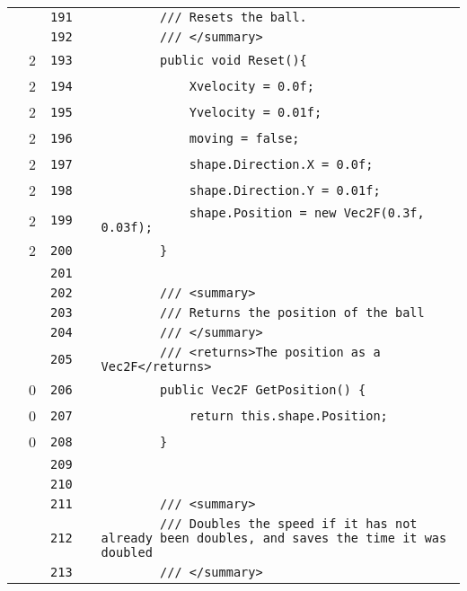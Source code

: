 \documentclass[a4paper,landscape,10pt]{article}
\begin{document}
\begin{longtable}[l]{lrrll}
\cellcolor{gray} &  & \verb~191~ & & \verb~        /// Resets the ball.~\\
\cellcolor{gray} &  & \verb~192~ & & \verb~        /// </summary>~\\
\cellcolor{green} & 2 & \verb~193~ & & \verb~        public void Reset(){~\\
\cellcolor{green} & 2 & \verb~194~ & & \verb~            Xvelocity = 0.0f;~\\
\cellcolor{green} & 2 & \verb~195~ & & \verb~            Yvelocity = 0.01f;~\\
\cellcolor{green} & 2 & \verb~196~ & & \verb~            moving = false;~\\
\cellcolor{green} & 2 & \verb~197~ & & \verb~            shape.Direction.X = 0.0f;~\\
\cellcolor{green} & 2 & \verb~198~ & & \verb~            shape.Direction.Y = 0.01f;~\\
\cellcolor{green} & 2 & \verb~199~ & & \verb~            shape.Position = new Vec2F(0.3f, 0.03f);~\\
\cellcolor{green} & 2 & \verb~200~ & & \verb~        }~\\
\cellcolor{gray} &  & \verb~201~ & & \verb~~\\
\cellcolor{gray} &  & \verb~202~ & & \verb~        /// <summary>~\\
\cellcolor{gray} &  & \verb~203~ & & \verb~        /// Returns the position of the ball~\\
\cellcolor{gray} &  & \verb~204~ & & \verb~        /// </summary>~\\
\cellcolor{gray} &  & \verb~205~ & & \verb~        /// <returns>The position as a Vec2F</returns>~\\
\cellcolor{red} & 0 & \verb~206~ & & \verb~        public Vec2F GetPosition() {~\\
\cellcolor{red} & 0 & \verb~207~ & & \verb~            return this.shape.Position;~\\
\cellcolor{red} & 0 & \verb~208~ & & \verb~        }~\\
\cellcolor{gray} &  & \verb~209~ & & \verb~~\\
\cellcolor{gray} &  & \verb~210~ & & \verb~~\\
\cellcolor{gray} &  & \verb~211~ & & \verb~        /// <summary>~\\
\cellcolor{gray} &  & \verb~212~ & & \verb~        /// Doubles the speed if it has not already been doubles, and saves the time it was doubled~\\
\cellcolor{gray} &  & \verb~213~ & & \verb~        /// </summary>~\\

\end{longtable}
\end{document}
